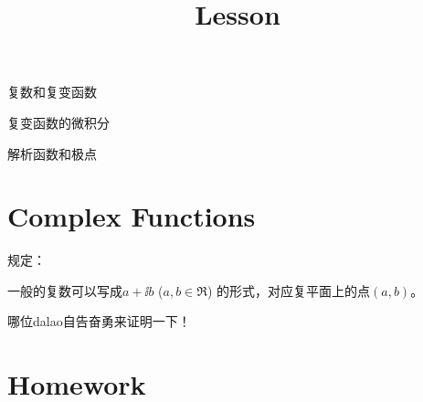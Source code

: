 \documentclass[CJK]{beamer}
\title{Lesson }
\author{}
\date{}
\begin{document}


\begin{frame}
\bch
\bitem
\item{复数和复变函数}
\item{复变函数的微积分}
\item{解析函数和极点}
\eitem
\ech
\end{frame}


\section{Complex Functions}

\begin{frame}
\bch
规定：

一般的复数可以写成$a +  \ii b $ ($a, b\in \Re$) 的形式，对应复平面上的点$(a, b)$。
\emini
{}
\emini
\ech
\end{frame}

\begin{frame}
\bch
{}


哪位dalao自告奋勇来证明一下！

\ech
\end{frame}

\begin{frame}
\chtitle{}
\bch
\ech
\end{frame}

\begin{frame}
\chtitle{}
\bch
\ech
\end{frame}

\begin{frame}
\chtitle{}
\bch
\ech
\end{frame}

\section{Homework}

\begin{frame}
\chtitle{}
\bch
\ech
\end{frame}
\end{document}
